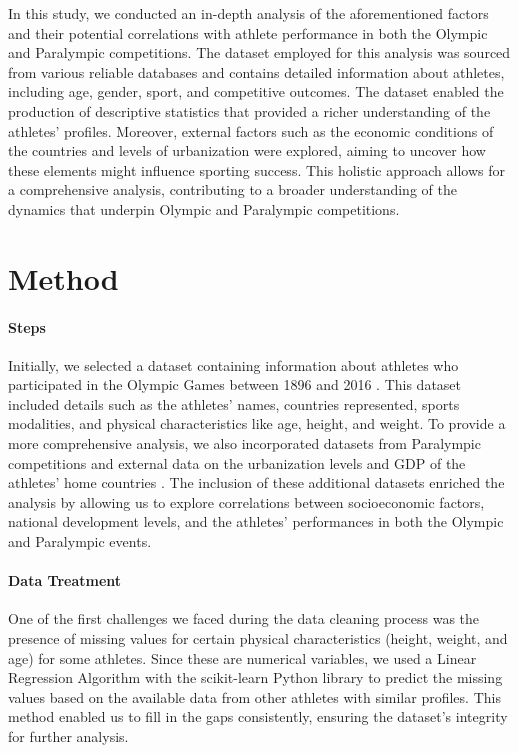 \documentclass{article}
\begin{document}
In this study, we conducted an in-depth analysis of the aforementioned factors and their potential correlations with athlete performance in both the Olympic and Paralympic competitions. The dataset employed for this analysis was sourced from various reliable databases and contains detailed information about athletes, including age, gender, sport, and competitive outcomes. The dataset enabled the production of descriptive statistics that provided a richer understanding of the athletes' profiles. Moreover, external factors such as the economic conditions of the countries and levels of urbanization were explored, aiming to uncover how these elements might influence sporting success. This holistic approach allows for a comprehensive analysis, contributing to a broader understanding of the dynamics that underpin Olympic and Paralympic competitions.

\section{Method}

\paragraph{Steps} Initially, we selected a dataset containing information about athletes who participated in the Olympic Games between 1896 and 2016 \cite{120_anos_olimpiadas}. This dataset included details such as the athletes' names, countries represented, sports modalities, and physical characteristics like age, height, and weight. To provide a more comprehensive analysis, we also incorporated datasets from Paralympic competitions \cite{paralimpiadas_verao_inverno} and external data on the urbanization levels \cite{urbanizacao_paises} and GDP of the athletes' home countries \cite{pib_paises}. The inclusion of these additional datasets enriched the analysis by allowing us to explore correlations between socioeconomic factors, national development levels, and the athletes’ performances in both the Olympic and Paralympic events.

\paragraph{Data Treatment} One of the first challenges we faced during the data cleaning process was the presence of missing values for certain physical characteristics (height, weight, and age) for some athletes. Since these are numerical variables, we used a Linear Regression Algorithm with the scikit-learn Python library to predict the missing values based on the available data from other athletes with similar profiles. This method enabled us to fill in the gaps consistently, ensuring the dataset’s integrity for further analysis.
\end{document}
